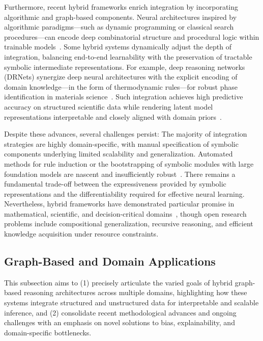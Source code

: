 \documentclass[sigconf]{acmart}
\begin{document}
Furthermore, recent hybrid frameworks enrich integration by incorporating algorithmic and graph-based components. Neural architectures inspired by algorithmic paradigms—such as dynamic programming or classical search procedures—can encode deep combinatorial structure and procedural logic within trainable models~\cite{ref5,ref56}. Some hybrid systems dynamically adjust the depth of integration, balancing end-to-end learnability with the preservation of tractable symbolic intermediate representations. For example, deep reasoning networks (DRNets) synergize deep neural architectures with the explicit encoding of domain knowledge—in the form of thermodynamic rules—for robust phase identification in materials science~\cite{ref45}. Such integration achieves high predictive accuracy on structured scientific data while rendering latent model representations interpretable and closely aligned with domain priors~\cite{ref45,ref93}.

Despite these advances, several challenges persist:
The majority of integration strategies are highly domain-specific, with manual specification of symbolic components underlying limited scalability and generalization.
Automated methods for rule induction or the bootstrapping of symbolic modules with large foundation models are nascent and insufficiently robust~\cite{ref1,ref22,ref45,ref49,ref54}.
There remains a fundamental trade-off between the expressiveness provided by symbolic representations and the differentiability required for effective neural learning.
Nevertheless, hybrid frameworks have demonstrated particular promise in mathematical, scientific, and decision-critical domains~\cite{ref1,ref5,ref10,ref11,ref42,ref45,ref49,ref54,ref68,ref86}, though open research problems include compositional generalization, recursive reasoning, and efficient knowledge acquisition under resource constraints.

\subsection{Graph-Based and Domain Applications}

This subsection aims to (1) precisely articulate the varied goals of hybrid graph-based reasoning architectures across multiple domains, highlighting how these systems integrate structured and unstructured data for interpretable and scalable inference, and (2) consolidate recent methodological advances and ongoing challenges with an emphasis on novel solutions to bias, explainability, and domain-specific bottlenecks.
\end{document}
